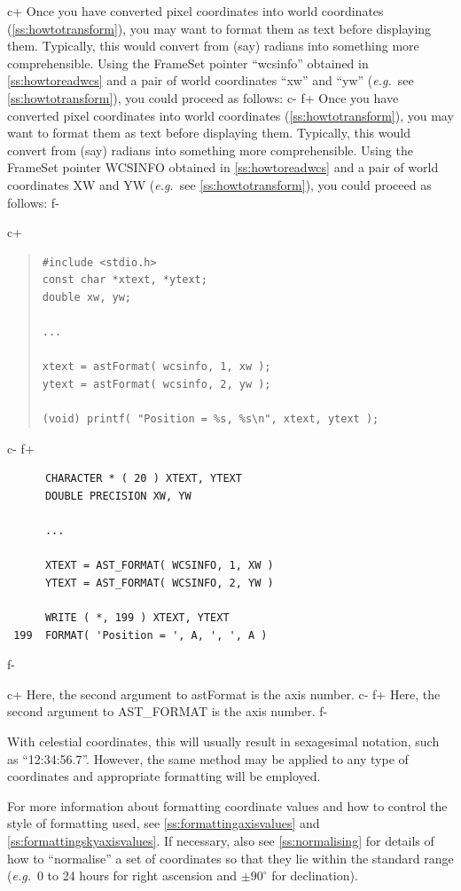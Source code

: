 \documentclass[twoside,11pt]{article}
\newcommand{\secref}[1]{\S\ref{#1}}
\renewcommand{\secref}[1]{\ref{#1}}
\begin{document}
c+
Once you have converted pixel coordinates into world coordinates
(\secref{ss:howtotransform}), you may want to format them as text
before displaying them. Typically, this would convert from (say)
radians into something more comprehensible. Using the FrameSet pointer
``wcsinfo'' obtained in \secref{ss:howtoreadwcs} and a pair of world
coordinates ``xw'' and ``yw'' ({\em{e.g.}}\ see
\secref{ss:howtotransform}), you could proceed as follows:
c-
f+
Once you have converted pixel coordinates into world coordinates
(\secref{ss:howtotransform}), you may want to format them as text
before displaying them. Typically, this would convert from (say)
radians into something more comprehensible. Using the FrameSet pointer
WCSINFO obtained in \secref{ss:howtoreadwcs} and a pair of world
coordinates XW and YW ({\em{e.g.}}\ see \secref{ss:howtotransform}),
you could proceed as follows:
f-

c+
\begin{quote}
\small
\begin{verbatim}
#include <stdio.h>
const char *xtext, *ytext;
double xw, yw;

...

xtext = astFormat( wcsinfo, 1, xw );
ytext = astFormat( wcsinfo, 2, yw );

(void) printf( "Position = %s, %s\n", xtext, ytext );
\end{verbatim}
\normalsize
\end{quote}
c-
f+
\small
\begin{verbatim}
      CHARACTER * ( 20 ) XTEXT, YTEXT
      DOUBLE PRECISION XW, YW

      ...

      XTEXT = AST_FORMAT( WCSINFO, 1, XW )
      YTEXT = AST_FORMAT( WCSINFO, 2, YW )

      WRITE ( *, 199 ) XTEXT, YTEXT
 199  FORMAT( 'Position = ', A, ', ', A )
\end{verbatim}
\normalsize
f-

c+
Here, the second argument to astFormat is the axis number.
c-
f+
Here, the second argument to AST\_FORMAT is the axis number.
f-

With celestial coordinates, this will usually result in sexagesimal
notation, such as ``12:34:56.7''. However, the same method may be
applied to any type of coordinates and appropriate formatting will be
employed.

For more information about formatting coordinate values and how to
control the style of formatting used, see
\secref{ss:formattingaxisvalues} and
\secref{ss:formattingskyaxisvalues}. If necessary, also see
\secref{ss:normalising} for details of how to ``normalise'' a set of
coordinates so that they lie within the standard range ({\em{e.g.}}\ 0
to 24 hours for right ascension and $\pm 90^\circ$ for
declination).
\end{document}

